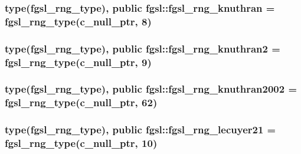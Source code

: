 \subsubsection[{fgsl\+\_\+rng\+\_\+knuthran}]{\setlength{\rightskip}{0pt plus 5cm}type({\bf fgsl\+\_\+rng\+\_\+type}), public fgsl\+::fgsl\+\_\+rng\+\_\+knuthran = {\bf fgsl\+\_\+rng\+\_\+type}(c\+\_\+null\+\_\+ptr, 8)}\label{namespacefgsl_af73840b5889e5a54be83e7596d5973c0}
\hypertarget{namespacefgsl_a528795b3607aafcfc90f8615237804fa}{}
\subsubsection[{fgsl\+\_\+rng\+\_\+knuthran2}]{\setlength{\rightskip}{0pt plus 5cm}type({\bf fgsl\+\_\+rng\+\_\+type}), public fgsl\+::fgsl\+\_\+rng\+\_\+knuthran2 = {\bf fgsl\+\_\+rng\+\_\+type}(c\+\_\+null\+\_\+ptr, 9)}\label{namespacefgsl_a528795b3607aafcfc90f8615237804fa}
\hypertarget{namespacefgsl_a4148e5146be887be4fac343f69ce9399}{}
\subsubsection[{fgsl\+\_\+rng\+\_\+knuthran2002}]{\setlength{\rightskip}{0pt plus 5cm}type({\bf fgsl\+\_\+rng\+\_\+type}), public fgsl\+::fgsl\+\_\+rng\+\_\+knuthran2002 = {\bf fgsl\+\_\+rng\+\_\+type}(c\+\_\+null\+\_\+ptr, 62)}\label{namespacefgsl_a4148e5146be887be4fac343f69ce9399}
\hypertarget{namespacefgsl_a636f91cce473d59c5b32c77a329f4486}{}
\subsubsection[{fgsl\+\_\+rng\+\_\+lecuyer21}]{\setlength{\rightskip}{0pt plus 5cm}type({\bf fgsl\+\_\+rng\+\_\+type}), public fgsl\+::fgsl\+\_\+rng\+\_\+lecuyer21 = {\bf fgsl\+\_\+rng\+\_\+type}(c\+\_\+null\+\_\+ptr, 10)}\label{namespacefgsl_a636f91cce473d59c5b32c77a329f4486}
\hypertarget{namespacefgsl_a9bc7cd5586595c2ac502e3f6496869a9}{}
